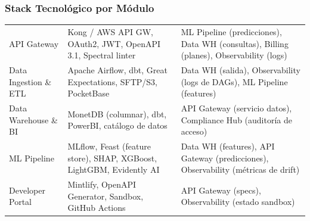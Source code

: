 ﻿\documentclass[11pt, letterpaper]{article}
\begin{document}

\subsubsection{Stack Tecnológico por Módulo}



\begin{table}[H]

\small

\centering

\begin{tabularx}{\linewidth}{>{\raggedright\arraybackslash}p{2.8cm} >{\raggedright\arraybackslash}p{5.2cm} >{\raggedright\arraybackslash}X}

\toprule

\multicolumn{1}{>{\raggedright\arraybackslash}p{2.8cm}}{\textbf{Módulo}} &

\multicolumn{1}{>{\raggedright\arraybackslash}p{5.2cm}}{\textbf{Tecnologías Principales}} &

\multicolumn{1}{>{\raggedright\arraybackslash}X}{\textbf{Interfaces / Dependencias}} \\

\midrule

API Gateway & Kong / AWS API GW, OAuth2, JWT, OpenAPI 3.1, Spectral linter & ML Pipeline (predicciones), Data WH (consultas), Billing (planes), Observability (logs) \\

\midrule

Data Ingestion \& ETL & Apache Airflow, dbt, Great Expectations, SFTP/S3, PocketBase & Data WH (salida), Observability (logs de DAGs), ML Pipeline (features) \\

\midrule

Data Warehouse \& BI & MonetDB (columnar), dbt, PowerBI, catálogo de datos & API Gateway (servicio datos), Compliance Hub (auditoría de acceso) \\

\midrule

ML Pipeline & MLflow, Feast (feature store), SHAP, XGBoost, LightGBM, Evidently AI & Data WH (features), API Gateway (predicciones), Observability (métricas de drift) \\

\midrule

Developer Portal & Mintlify, OpenAPI Generator, Sandbox, GitHub Actions & API Gateway (specs), Observability (estado sandbox) \\


\end{tabularx}
\end{table}
\end{document}

